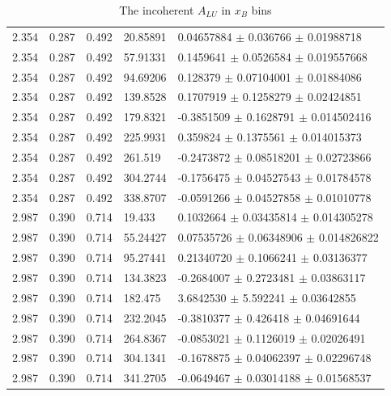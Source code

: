 \begin{table}[!h]
\begin{center}
\begin{tabular}{||l|l|l|l|l||}
  2.354 & 0.287 & 0.492 &   20.85891  &  0.04657884   $\pm$  0.036766     $\pm$  0.01988718     \\
  2.354 & 0.287 & 0.492 &   57.91331  &  0.1459641    $\pm$  0.0526584    $\pm$  0.019557668    \\
  2.354 & 0.287 & 0.492 &   94.69206  &  0.128379     $\pm$  0.07104001   $\pm$  0.01884086     \\
  2.354 & 0.287 & 0.492 &   139.8528  &  0.1707919    $\pm$  0.1258279    $\pm$  0.02424851     \\
  2.354 & 0.287 & 0.492 &   179.8321  &  -0.3851509   $\pm$  0.1628791    $\pm$  0.014502416    \\
  2.354 & 0.287 & 0.492 &   225.9931  &  0.359824     $\pm$  0.1375561    $\pm$  0.014015373    \\
  2.354 & 0.287 & 0.492 &   261.519   &  -0.2473872   $\pm$  0.08518201   $\pm$  0.02723866     \\
  2.354 & 0.287 & 0.492 &   304.2744  &  -0.1756475   $\pm$  0.04527543   $\pm$  0.01784578     \\
  2.354 & 0.287 & 0.492 &   338.8707  &  -0.0591266   $\pm$  0.04527858   $\pm$  0.01010778     \\
 \hline
                                                                        
  2.987 & 0.390 & 0.714 &   19.433    &  0.1032664    $\pm$  0.03435814   $\pm$  0.014305278    \\
  2.987 & 0.390 & 0.714 &   55.24427  &  0.07535726   $\pm$  0.06348906   $\pm$  0.014826822    \\
  2.987 & 0.390 & 0.714 &   95.27441  &  0.21340720   $\pm$  0.1066241    $\pm$  0.03136377     \\
  2.987 & 0.390 & 0.714 &   134.3823  &  -0.2684007   $\pm$  0.2723481    $\pm$  0.03863117     \\
  2.987 & 0.390 & 0.714 &   182.475   &  3.6842530    $\pm$  5.592241     $\pm$  0.03642855     \\
  2.987 & 0.390 & 0.714 &   232.2045  &  -0.3810377   $\pm$  0.426418     $\pm$  0.04691644     \\
  2.987 & 0.390 & 0.714 &   264.8367  &  -0.0853021   $\pm$  0.1126019    $\pm$  0.02026491     \\
  2.987 & 0.390 & 0.714 &   304.1341  &  -0.1678875   $\pm$  0.04062397   $\pm$  0.02296748     \\
  2.987 & 0.390 & 0.714 &   341.2705  &  -0.0649467   $\pm$  0.03014188   $\pm$  0.01568537     \\
 \hline
 \hline
 \end{tabular}
 \caption{The incoherent $A_{LU}$ in $x_B$ bins}
 \label{table:InCoh_xB_BSA}
 \end{center}
\end{table}



